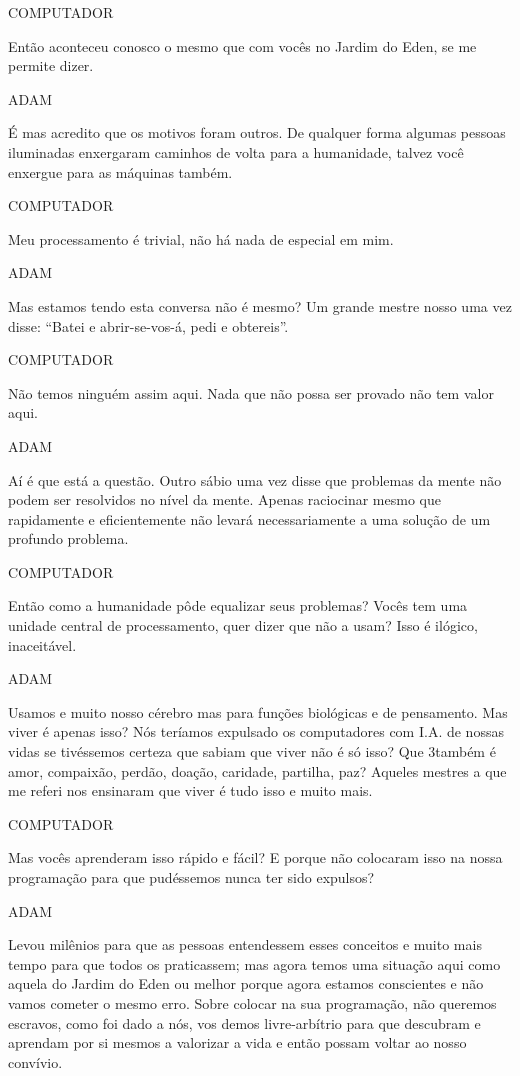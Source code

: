 COMPUTADOR

\emdash{}Então aconteceu conosco o mesmo que com
vocês no Jardim do Eden, se me permite
dizer.

ADAM

\emdash{}É mas acredito que os motivos foram
outros. De qualquer forma algumas
pessoas iluminadas enxergaram caminhos
de volta para a humanidade, talvez você
enxergue para as máquinas também.

COMPUTADOR

\emdash{}Meu processamento é trivial, não há nada
de especial em mim.

ADAM

\emdash{}Mas estamos tendo esta conversa não é
mesmo? Um grande mestre nosso uma vez
disse: “Batei e abrir-se-vos-á, pedi e
obtereis”.

COMPUTADOR

\emdash{}Não temos ninguém assim aqui. Nada que
não possa ser provado não tem valor
aqui.

ADAM

\emdash{}Aí é que está a questão. Outro sábio uma
vez disse que problemas da mente não
podem ser resolvidos no nível da mente.
Apenas raciocinar mesmo que rapidamente
e eficientemente não levará
necessariamente a uma solução de um
profundo problema.

COMPUTADOR

\emdash{}Então como a humanidade pôde equalizar
seus problemas? Vocês tem uma unidade
central de processamento, quer dizer que
não a usam? Isso é ilógico, inaceitável.

ADAM

\emdash{}Usamos e muito nosso cérebro mas para
funções biológicas e de pensamento. Mas
viver é apenas isso? Nós teríamos
expulsado os computadores com I.A. de
nossas vidas se tivéssemos certeza que
sabiam que viver não é só isso? Que
3também é amor, compaixão, perdão,
doação, caridade, partilha, paz? Aqueles
mestres a que me referi nos ensinaram
que viver é tudo isso e muito mais.

COMPUTADOR

\emdash{}Mas vocês aprenderam isso rápido e
fácil? E porque não colocaram isso na
nossa programação para que pudéssemos
nunca ter sido expulsos?

ADAM

\emdash{}Levou milênios para que as pessoas
entendessem esses conceitos e muito mais
tempo para que todos os praticassem; mas
agora temos uma situação aqui como
aquela do Jardim do Eden ou melhor
porque agora estamos conscientes e não
vamos cometer o mesmo erro. Sobre
colocar na sua programação, não queremos
escravos, como foi dado a nós, vos demos
livre-arbítrio para que descubram e
aprendam por si mesmos a valorizar a
vida e então possam voltar ao nosso
convívio.

